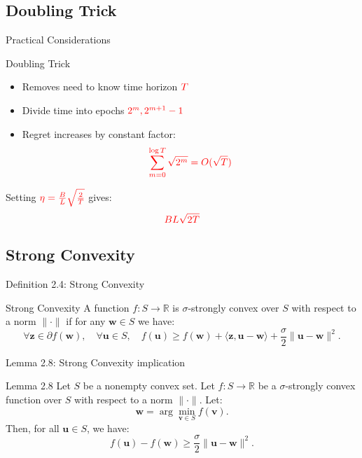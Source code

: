 \documentclass[handout]{beamer}
\begin{document}
\subsection{Doubling Trick}
\begin{frame}{Practical Considerations}
\begin{block}{Doubling Trick}
\begin{itemize}
\item Removes need to know time horizon $\textcolor{red}{T}$
\item Divide time into epochs $\textcolor{red}{2^m,2^{m+1}-1}$
\item Regret increases by constant factor:
\[
\textcolor{red}{\sum_{m=0}^{\log T} \sqrt{2^m} = O(\sqrt{T})}
\]
\end{itemize}
\end{block}

\begin{example}
Setting $\textcolor{red}{\eta = \frac{B}{L}\sqrt{\frac{2}{T}}}$ gives:
\[
\textcolor{red}{BL\sqrt{2T}}
\]
\end{example}
\end{frame}

\subsection{Strong Convexity}
\begin{frame}{Definition 2.4: Strong Convexity}
    \begin{block}{Strong Convexity}
        A function \( f: S \to \mathbb{R} \) is \(\sigma\)-strongly convex over \( S \) with respect to a norm \( \|\cdot\| \) if for any \( \mathbf{w} \in S \) we have:
        \begin{equation*}
            \forall \mathbf{z} \in \partial f(\mathbf{w}), \quad \forall \mathbf{u} \in S, \quad 
            f(\mathbf{u}) \geq f(\mathbf{w}) + \langle \mathbf{z}, \mathbf{u} - \mathbf{w} \rangle + \frac{\sigma}{2} \|\mathbf{u} - \mathbf{w}\|^2.
        \end{equation*}
    \end{block}
\end{frame}

\begin{frame}{Lemma 2.8: Strong Convexity implication}
    \begin{block}{Lemma 2.8}
        Let \( S \) be a nonempty convex set. Let \( f: S \to \mathbb{R} \) be a \( \sigma \)-strongly convex function over \( S \) with respect to a norm \( \|\cdot\| \). Let:
        \[
        \mathbf{w} = \arg\min_{\mathbf{v} \in S} f(\mathbf{v}).
        \]
        Then, for all \( \mathbf{u} \in S \), we have:
        \begin{equation*}
            f(\mathbf{u}) - f(\mathbf{w}) \geq \frac{\sigma}{2} \|\mathbf{u} - \mathbf{w}\|^2.
          \end{equation*}
    \end{block}
\end{frame}
\end{document}
